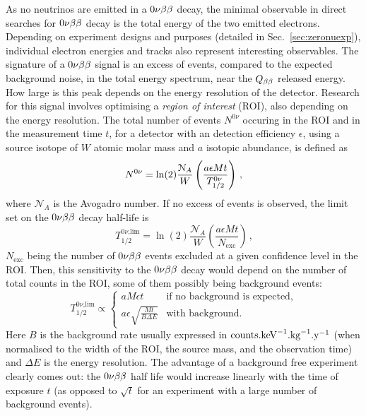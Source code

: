 As no neutrinos are emitted in a $0\nu\beta\beta$ decay, the minimal observable in direct searches for $0\nu\beta\beta$ decay is the total energy of the two emitted electrons.
Depending on experiment designs and purposes (detailed in Sec.~\ref{sec:zeronuexp}), individual electron energies and tracks also represent interesting observables.
The signature of a $0\nu\beta\beta$ signal is an excess of events, compared to the expected background noise, in the total energy spectrum, near the $Q_{\beta\beta}$ released energy.
How large is this peak depends on the energy resolution of the detector.
Research for this signal involves optimising a \emph{region of interest} (ROI), also depending on the energy resolution.
The total number of events $N^{0\nu}$ occuring in the ROI and in the measurement time $t$, for a detector with an detection efficiency $\epsilon$, using a source isotope of $W$ atomic molar mass and $a$ isotopic abundance, is defined as
\begin{equation}
  N^{0\nu}=\ln(2)\frac{\mathcal{N}_{A}}{W}\left(\frac{a\epsilon M t}{T_{1/2}^{0\nu}}\right)\,\text{,}
  \label{eq:Nevents}
\end{equation}
where $\mathcal{N}_{A}$ is the Avogadro number.
If no excess of events is observed, the limit set on the $0\nu\beta\beta$ decay half-life is
\begin{equation}
  T_{1/2}^{0\nu\text{,lim}}=\ln(2)\frac{\mathcal{N}_{A}}{W}\left(\frac{a\epsilon M t}{N_{\text{exc}}}\right)\,\text{,}
  \label{eq:Tlim}
\end{equation}
$N_{\text{exc}}$ being the number of $0\nu\beta\beta$ events excluded at a given confidence level in the ROI.
Then, this sensitivity to the $0\nu\beta\beta$ decay would depend on the number of total counts in the ROI, some of them possibly being background events:
\begin{equation}
  T_{1/2}^{0\nu\text{,lim}} \propto \left\{
  \begin{array}{ll}
    a M \epsilon t & \text{if no background is expected,} \\
    a \epsilon \sqrt{\frac{M t}{B \Delta E}} & \text{with background.}
  \end{array}
  \right.
  \label{eq:sensitivity_background}
\end{equation}
Here $B$ is the background rate usually expressed in $\text{counts.keV}^{-1}\text{.kg}^{-1}\text{.y}^{-1}$ (when normalised to the width of the ROI, the source mass, and the observation time) and $\Delta E$ is the energy resolution.
The advantage of a background free experiment clearly comes out: the $0\nu\beta\beta$ half life would increase linearly with the time of exposure $t$ (as opposed to $\sqrt t$ for an experiment with a large number of background events).
